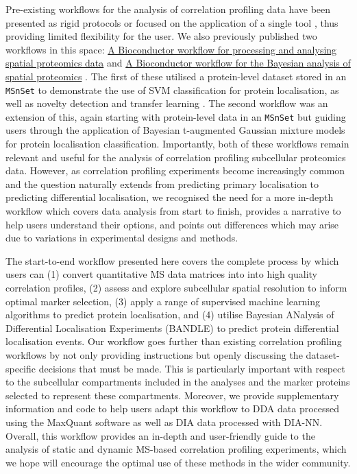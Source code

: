 \documentclass[9pt,a4paper,]{extarticle}
\begin{document}
Pre-existing workflows for the analysis of correlation profiling data have been
presented as rigid protocols \citep{Itzhak2018, Orre2019} or focused on the application
of a single tool \citep{Kennedy2020}, thus providing limited flexibility for the user.
We also previously published two workflows in this space: \href{https://f1000research.com/articles/5-2926}{A Bioconductor workflow for processing and analysing spatial proteomics data} \citep{Breckels2018}
and \href{https://f1000research.com/articles/8-446}{A Bioconductor workflow for the Bayesian analysis of spatial proteomics} \citep{Crook2019}. The first of
these utilised a protein-level dataset stored in an \texttt{MSnSet} to demonstrate the
use of SVM classification for protein localisation, as well as novelty detection
and transfer learning \citep{Breckels2018}. The second workflow was an extension of
this, again starting with protein-level data in an \texttt{MSnSet} but guiding users
through the application of Bayesian t-augmented Gaussian mixture models for
protein localisation classification. Importantly, both of these workflows remain
relevant and useful for the analysis of correlation profiling subcellular proteomics data.
However, as correlation profiling experiments become increasingly common and the
question naturally extends from predicting primary localisation to predicting
differential localisation, we recognised the need for a more in-depth workflow
which covers data analysis from start to finish, provides a narrative to help
users understand their options, and points out differences which may arise due to
variations in experimental designs and methods.

The start-to-end workflow presented here covers the complete process by which
users can (1) convert quantitative MS data matrices into into high quality
correlation profiles, (2) assess and explore subcellular spatial resolution to
inform optimal marker selection, (3) apply a range of supervised machine learning
algorithms to predict protein localisation, and (4) utilise Bayesian ANalysis of
Differential Localisation Experiments (BANDLE) to predict protein differential
localisation events. Our workflow goes further than existing correlation
profiling workflows by not only providing instructions but openly
discussing the dataset-specific decisions that must be made. This is particularly
important with respect to the subcellular compartments included in the analyses
and the marker proteins selected to represent these compartments. Moreover, we
provide supplementary information and code to help users adapt this workflow to
DDA data processed using the MaxQuant software as well as DIA data processed with
DIA-NN. Overall, this workflow provides an in-depth and user-friendly guide to
the analysis of static and dynamic MS-based correlation profiling experiments,
which we hope will encourage the optimal use of these methods in the wider community.
\end{document}
